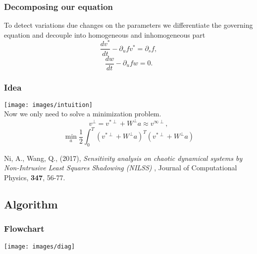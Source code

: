 \documentclass{beamer}
\begin{document}
\begin{frame}
  \frametitle{Decomposing our equation}
  To detect variations due changes on the parameters we differentiate the governing equation and decouple into homogeneous and inhomogeneous part
  \begin{equation}
    \frac{dv^*}{dt} - \partial_u fv^* = \partial_s f,
  \end{equation}
  \begin{equation}
    \frac{dw}{dt} - \partial_u fw = 0.
  \end{equation}
\end{frame}

\begin{frame}
  \frametitle{Idea}
  \begin{center}

    \texttt{[image: images/intuition]}\\

    Now we only need to solve a minimization problem.
    \begin{equation}
      v^\perp = v^{*\perp} + W^\perp a \approx v^{\infty \perp},
    \end{equation}
    \begin{equation}
      \min_a \frac{1}{2} \int_0^T  (v^{*\perp} + W^\perp a)^T (v^{*\perp} + W^\perp a)
    \end{equation}

    \tiny{Ni, A., Wang, Q., (2017), \textit{Sensitivity analysis on chaotic dynamical systems by Non-Intrusive Least Squares Shadowing (NILSS)} , Journal of Computational Physics, \textbf{347}, 56-77.}

\end{center}
\end{frame}

\subsection{Algorithm}
\begin{frame}
  \frametitle{Flowchart}
  \begin{center}

    \texttt{[image: images/diag]}\\


\end{center}
\end{frame}

\end{document}
